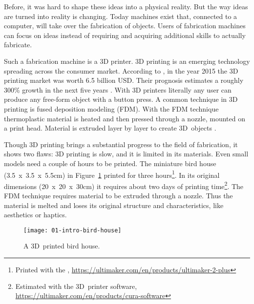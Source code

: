 \documentclass[../ClassicThesis.tex]{subfiles}
\begin{document}
Before, it was hard to shape these ideas into a physical reality. But
the way ideas are turned into reality is changing. Today machines
exist that, connected to a computer, will take over the fabrication of
objects. Users of fabrication machines can focus on ideas
instead of requiring and acquiring additional skills to actually
fabricate.


Such a fabrication machine is a 3D printer. 3D printing is an emerging
technology spreading across the consumer market. According to
, in the year 2015 the 3D printing market was
worth 6.5 billion USD. Their prognosis estimates a roughly 300\%
growth in the next five years \cite{wohlers-market}. With 3D printers
literally any user can produce any free-form object with a button
press. A common technique in 3D printing is fused deposition modeling
(FDM). With the FDM technique
thermoplastic material is heated and then pressed through a nozzle,
mounted on a print head. Material is extruded layer by layer  to
create 3D~objects \cite{fdm}.

Though 3D printing brings a substantial progress to the
field of fabrication, it shows two flaws: 3D printing is
slow, and it is limited in its materials. Even small models
need a couple of hours to be printed. The miniature bird
house (3.5~x~3.5~x~5.5cm) in Figure~\ref{fig:intro-bird-house}
printed for three hours\footnote{Printed with the
  ,
  \url{https://ultimaker.com/en/products/ultimaker-2-plus}}.
In its original dimensions (20~x~20~x~30cm) it requires about
two days of printing time\footnote{Estimated with the
   3D~printer software,
  \url{https://ultimaker.com/en/products/cura-software}}.
The FDM technique requires material to be extruded through a
nozzle. Thus the material is melted and loses its original
structure and characteristics, like aesthetics or haptics.

\begin{figure}[ht]
  \texttt{[image: 01-intro-bird-house]}
  \caption{A 3D~printed bird house.}
  \label{fig:intro-bird-house}
\end{figure}


\end{document}

